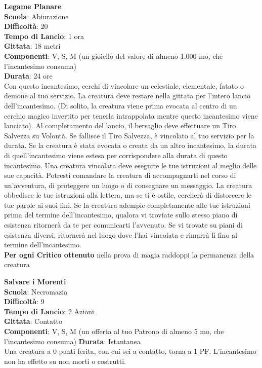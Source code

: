 \begin{multicols}{2}
\medskip\textbf{Legame Planare}\\
\textbf{Scuola}: Abiurazione\\
\textbf{Difficoltà}: 20\\
\textbf{Tempo di Lancio}: 1 ora\\
\textbf{Gittata}: 18 metri\\
\textbf{Componenti}: V, S, M (un gioiello del valore di almeno 1.000 mo, che l'incantesimo consuma)\\
\textbf{Durata}: 24 ore\\
Con questo incantesimo, cerchi di vincolare un celestiale, elementale, fatato o demone al tuo servizio. La creatura deve restare nella gittata per l'intero lancio dell'incantesimo. (Di solito, la creatura viene prima evocata al centro di un cerchio magico invertito per tenerla intrappolata mentre questo incantesimo viene lanciato). Al completamento del lancio, il bersaglio deve effettuare un Tiro Salvezza su Volontà. Se fallisce il Tiro Salvezza, è vincolato al tuo servizio per la durata. Se la creatura è stata evocata o creata da un altro incantesimo, la durata di quell'incantesimo viene estesa per corrispondere alla durata di questo incantesimo. Una creatura vincolata deve eseguire le tue istruzioni al meglio delle sue capacità. Potresti comandare la creatura di accompagnarti nel corso di un'avventura, di proteggere un luogo o di consegnare un messaggio. La creatura obbedisce le tue istruzioni alla lettera, ma se ti è ostile, cercherà di distorcere le tue parole ai suoi fini. Se la creatura adempie completamente alle tue istruzioni prima del termine dell'incantesimo, qualora vi troviate sullo stesso piano di esistenza ritornerà da te per comunicarti l'avvenuto. Se vi trovate su piani di esistenza diversi, ritornerà nel luogo dove l'hai vincolata e rimarrà lì fino al termine dell'incantesimo.\\
\textbf{Per ogni Critico ottenuto} nella prova di magia raddoppi la permanenza della creatura

\medskip\textbf{Salvare i Morenti}\\
\textbf{Scuola}: Necromazia\\
\textbf{Difficoltà}: 9\\
\textbf{Tempo di Lancio}: 2 Azioni\\
\textbf{Gittata}: Contatto\\
\textbf{Componenti}: V, S, M (un offerta al tuo Patrono di almeno 5 mo, che l'incantesimo consuma)
\textbf{Durata}: Istantanea\\
Una creatura a 0 punti ferita, con cui sei a contatto, torna a 1 PF. L'incantesimo non ha effetto su non morti o costrutti.


\end{multicols}
